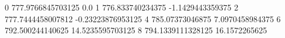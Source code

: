0 777.9766845703125 0.0
1 776.833740234375 -1.1429443359375
2 777.7444458007812 -0.23223876953125
4 785.07373046875 7.0970458984375
6 792.500244140625 14.5235595703125
8 794.1339111328125 16.1572265625
